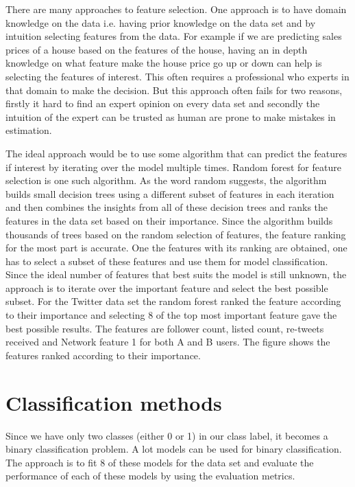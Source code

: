 \documentclass[sigconf]{acmart}
\begin{document}
There are many approaches to feature selection. One approach is to have domain knowledge on the data i.e. having prior knowledge on the data set and by intuition selecting features from the data. For example if we are predicting sales prices of a house based on the features of the house, having an in depth knowledge on what feature make the house price go up or down can help is selecting the features of interest. This often requires a professional who experts in that domain to make the decision. But this approach often fails for two reasons, firstly it hard to find an expert opinion on every data set and secondly the intuition of the expert can be trusted as human are prone to make mistakes in estimation.

The ideal approach would be to use some algorithm that can predict the features if interest by iterating over the model multiple times. Random forest for feature selection is one such algorithm. As the word random suggests, the algorithm builds small decision trees using a different subset of features in each iteration and then combines the insights from all of these decision trees and ranks the features in the data set based on their importance. Since the algorithm builds thousands of trees based on the random selection of features, the feature ranking for the most part is accurate. One the features with its ranking are obtained, one has to select a subset of these features and use them for model classification. Since the ideal number of features that best suits the model is still unknown, the approach is to iterate over the important feature and select the best possible subset. For the Twitter data set the random forest ranked the feature according to their importance and selecting 8 of the top most important feature gave the best possible results.
The features are follower count, listed count, re-tweets received and Network feature 1 for both A and B users. The figure shows the features ranked according to their importance.


\section{Classification methods}
Since we have only two classes (either 0 or 1) in our class label, it becomes a binary classification problem. A lot models can be used for binary classification. The approach is to fit 8 of these models for the data set and evaluate the performance of each of these models by using the evaluation metrics.
\end{document}
